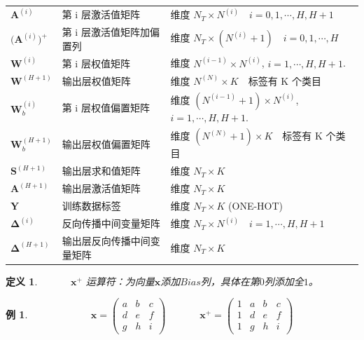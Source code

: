 \documentclass[UTF-8]{progbookcn}
\newtheorem{example}{例}[chapter]         %
\newtheorem{definition}{定义}[chapter]
\begin{document}
\begin{table}[!!htbp]
{\begin{tabular}{|l|l|l|}
$\bm{A}^{(i)}$   & 第 i 层激活值矩阵 & 维度 $N_T\times N^{(i)}$~~$i=0,1,\cdots,H,H+1$                                                                              \\
$\big(\bm{A}^{(i)}\big)^+$   & 第 i 层激活值矩阵加偏置列 & 维度 $N_T\times (N^{(i)}+1)$~~$i=0,1,\cdots,H$                                                                            \\
$\bm{W}^{(i)}$   & 第 i 层权值矩阵  & 维度 $N^{(i-1)}\times N^{(i)}$, $i=1,\cdots,H,H+1$.                                                                                                  \\
$\bm{W}^{(H+1)}$ & 输出层权值矩阵      & 维度 $N^{(N)}\times K$~~标签有 K 个类目                                                                                   \\
$\bm{W}_b^{(i)}$   & 第 i 层权值偏置矩阵  & 维度 $(N^{(i-1)}+1)\times N^{(i)}$, $i=1,\cdots,H,H+1$.                                                                                                  \\
$\bm{W}_b^{(H+1)}$   &输出层权值偏置矩阵  & 维度 $(N^{(N)}+1)\times K$~~标签有 K 个类目                                                                                               \\
$\bm{S}^{(H+1)}$ & 输出层求和值矩阵     & 维度 $N_T\times K $                                                                                                           \\
$\bm{A}^{(H+1)}$ & 输出层激活值矩阵     & 维度 $N_T\times K $                                                                                                      \\
$\bm{Y}$ & 训练数据标签 & 维度 $N_T \times K$ (ONE-HOT)\\
$\bm{\Delta}^{(i)}$ & 反向传播中间变量矩阵 & 维度 $N_T \times N^{(i)}$~~$i=1,\cdots,H,H+1$\\
$\bm{\Delta}^{(H+1)}$ & 输出层反向传播中间变量矩阵 & 维度 $N_T \times K$\\ \hline
\end{tabular}}
\end{table}


\begin{definition}
  ~~~~~~$\bm{x}^+$ 运算符：为向量$\bm{x}$添加$Bias$列，具体在第$0$列添加全$1$。
\end{definition}

\begin{example}
  ~~~~~~~~~~~~$\bm{x} = \left(
 \begin{matrix}
   a & b & c \\
   d & e & f \\
   g & h & i
  \end{matrix}
  \right) $~~~~~~
  $\bm{x}^+ = \left(
\begin{matrix}
   1 & a & b & c \\
   1 & d & e & f \\
   1 & g & h & i
  \end{matrix}
  \right) $
\end{example}
\end{document}
